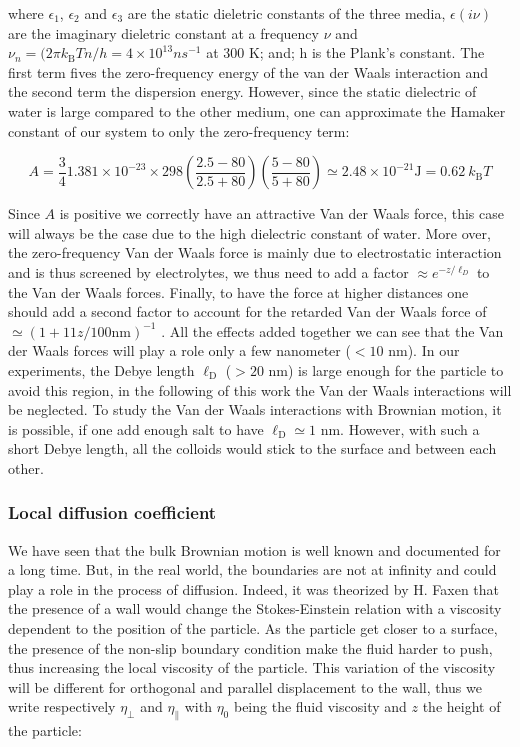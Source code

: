 where $\epsilon_1$, $\epsilon_2$ and $\epsilon_3$ are the static dieletric constants of the three media, $\epsilon (i\nu)$ are the imaginary dieletric constant at a frequency $\nu$ and $\nu_n = (2 \pi k_\mathrm{B}Tn/h = 4 \times 10^{13} n s^{-1}$ at $300$ K; and; h is the Plank's constant. The first term fives the zero-frequency energy of the van der Waals interaction and the second term the dispersion energy.
However, since the static dielectric of water is large compared to the other medium, one can approximate the Hamaker constant of our system to only the zero-frequency term:

\begin{equation}
	A = \frac{3}{4} 1.381 \times 10^{-23} \times 298 
	\left(
	\frac{2.5 - 80}{2.5 + 80}
	\right)
	\left(
	\frac{5 - 80}{5 + 80}
	\right)
	\simeq
	2.48 \times 10^{-21} \mathrm{J}	= 0.62 ~ k_\mathrm{B}T
\end{equation}

Since $A$ is positive we correctly have an attractive Van der Waals force, this case will always be the case due to the high dielectric constant of water. More over, the zero-frequency Van der Waals force is mainly due to electrostatic interaction and is thus screened by electrolytes, we thus need to add a factor $\approx e^{-z/\ell_D}$ to the Van der Waals forces. Finally, to have the force at higher distances one should add a second factor to account for the retarded Van der Waals force of $ \simeq (1  + 11z/100 \mathrm{nm})^{-1}$ \cite{israelachvili_intermolecular_2015}. All the effects added together we can see that the Van der Waals forces will play a role only a few nanometer ($< 10$ nm). In our experiments, the Debye length $\ell _\mathrm{D}$ ($>20$ nm) is large enough for the particle to avoid this region, in the following of this work the Van der Waals interactions will be neglected. To study the Van der Waals interactions with Brownian motion, it is possible, if one add enough salt to have $\ell_\mathrm{D} \simeq 1$ nm. However, with such a short Debye length, all the colloids would stick to the surface and between each other.

\subsubsection{Local diffusion coefficient}



We have seen that the bulk Brownian motion is well known and documented for a long time. But, in the real world, the boundaries are not at infinity and could play a role in the process of diffusion. Indeed, it was theorized by H. Faxen \cite{faxen_fredholm_1924} that the presence of a wall would change the Stokes-Einstein relation with a viscosity dependent to the position of the particle. As the particle get closer to a surface, the presence of the non-slip boundary condition make the fluid harder to push, thus increasing the local viscosity of the particle. This variation of the viscosity will be different for orthogonal and parallel displacement to the wall, thus we write respectively $\eta_\bot $ and $\eta_\parallel$ with $\eta_0$ being the fluid viscosity and $z$ the height of the particle:

